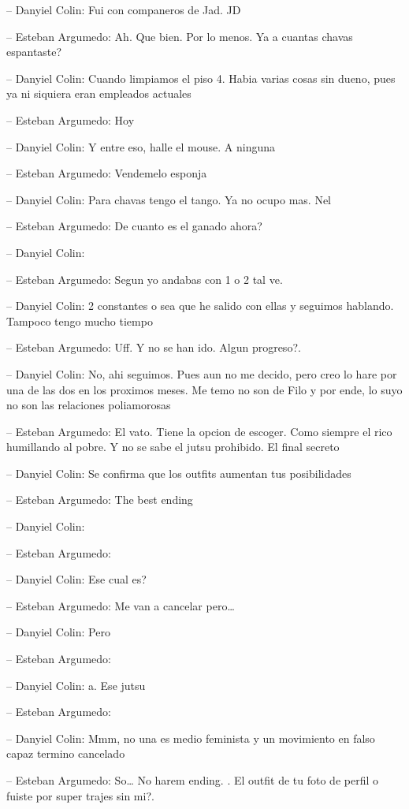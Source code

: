 -- Danyiel Colin: Fui con companeros de Jad. JD

-- Esteban Argumedo: Ah. Que bien. Por lo menos. Ya a cuantas chavas
espantaste?

-- Danyiel Colin: Cuando limpiamos el piso 4. Habia varias cosas sin
dueno, pues ya ni siquiera eran empleados actuales

-- Esteban Argumedo: Hoy

-- Danyiel Colin: Y entre eso, halle el mouse. A ninguna

-- Esteban Argumedo: Vendemelo esponja

-- Danyiel Colin: Para chavas tengo el tango. Ya no ocupo mas. Nel

-- Esteban Argumedo: De cuanto es el ganado ahora?

-- Danyiel Colin:

-- Esteban Argumedo: Segun yo andabas con 1 o 2 tal ve.

-- Danyiel Colin: 2 constantes o sea que he salido con ellas y seguimos
hablando. Tampoco tengo mucho tiempo

-- Esteban Argumedo: Uff. Y no se han ido. Algun progreso?.

-- Danyiel Colin: No, ahi seguimos. Pues aun no me decido, pero creo lo
hare por una de las dos en los proximos meses. Me temo no son de Filo y
por ende, lo suyo no son las relaciones poliamorosas

-- Esteban Argumedo: El vato. Tiene la opcion de escoger. Como siempre
el rico humillando al pobre. Y no se sabe el jutsu prohibido. El final
secreto

-- Danyiel Colin: Se confirma que los outfits aumentan tus posibilidades

-- Esteban Argumedo: The best ending

-- Danyiel Colin:

-- Esteban Argumedo:

-- Danyiel Colin: Ese cual es?

-- Esteban Argumedo: Me van a cancelar pero\ldots{}

-- Danyiel Colin: Pero

-- Esteban Argumedo:

-- Danyiel Colin: a. Ese jutsu

-- Esteban Argumedo:

-- Danyiel Colin: Mmm, no una es medio feminista y un movimiento en
falso capaz termino cancelado

-- Esteban Argumedo: So\ldots{} No harem ending. . El outfit de tu foto
de perfil o fuiste por super trajes sin mi?.


